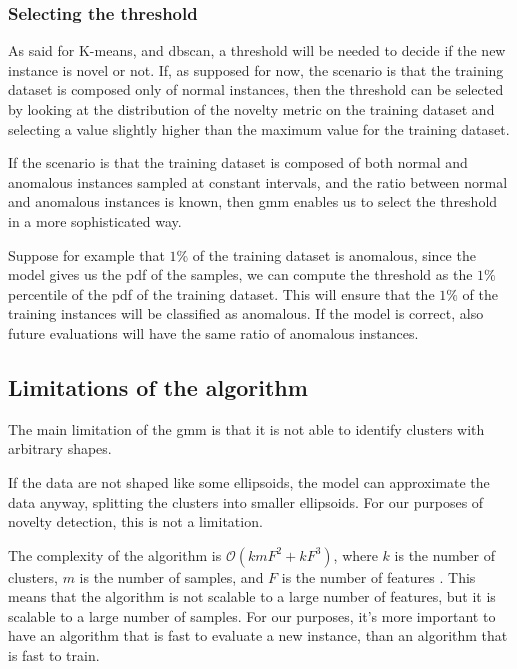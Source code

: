 \subsubsection{Selecting the threshold}
As said for K-means, and \gls{dbscan}, a threshold will be needed to decide if the new instance is novel or not. If, as supposed for now, the scenario is that the training dataset is composed only of normal instances, then the threshold can be selected by looking at the distribution of the novelty metric on the training dataset and selecting a value slightly higher than the maximum value for the training dataset.

If the scenario is that the training dataset is composed of both normal and anomalous instances sampled at constant intervals, and the ratio between normal and anomalous instances is known, then \gls{gmm} enables us to select the threshold in a more sophisticated way.

Suppose for example that $1\%$ of the training dataset is anomalous, since the model gives us the \gls{pdf} of the samples, we can compute the threshold as the $1\%$ percentile of the \gls{pdf} of the training dataset. This will ensure that the $1\%$ of the training instances will be classified as anomalous. If the model is correct, also future evaluations will have the same ratio of anomalous instances.

\subsection{Limitations of the algorithm}
The main limitation of the \gls{gmm} is that it is not able to identify clusters with arbitrary shapes.

If the data are not shaped like some ellipsoids, the model can approximate the data anyway, splitting the clusters into smaller ellipsoids. For our purposes of novelty detection, this is not a limitation.

The complexity of the algorithm is $\mathcal{O}(kmF^2+kF^3)$, where $k$ is the number of clusters, $m$ is the number of samples, and $F$ is the number of features . This means that the algorithm is not scalable to a large number of features, but it is scalable to a large number of samples.
For our purposes, it's more important to have an algorithm that is fast to evaluate a new instance, than an algorithm that is fast to train.